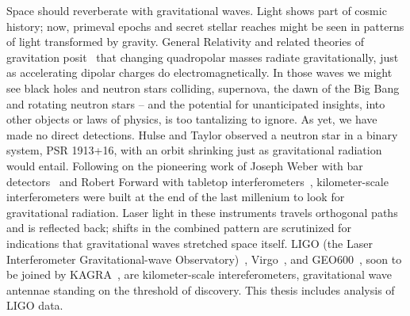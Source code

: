 



        Space should reverberate with gravitational waves. 
Light shows part of cosmic history; now, primeval epochs and secret stellar reaches might be seen in patterns of light transformed by gravity. 
General Relativity and related theories of gravitation posit~\cite{EinsteinRosen1937} that changing quadropolar masses radiate gravitationally, just as accelerating dipolar charges do electromagnetically. 
In those waves we might see black holes and neutron stars colliding, supernova, the dawn of the Big Bang and rotating neutron stars -- and the potential for unanticipated insights, into other objects or laws of physics, is too tantalizing to ignore. 
As yet, we have made no direct detections. 
Hulse and Taylor \cite{HulseTaylor1975} observed a neutron star in a binary system, PSR 1913+16, with an orbit shrinking just as gravitational radiation would entail. 
Following on the pioneering work of Joseph Weber with bar detectors~\cite{Weber1960} and Robert Forward with tabletop interferometers~\cite{Forward1978}, kilometer-scale interferometers were built at the end of the last millenium to look for gravitational radiation. 
Laser light in these instruments travels orthogonal paths and is reflected back; shifts in the combined pattern are scrutinized for indications that gravitational waves stretched space itself. 
LIGO (the Laser Interferometer Gravitational-wave Observatory)~\cite{LIGOFirst2004,Fricke2009}, Virgo~\cite{Acernese2005}, and GEO600~\cite{Willke2002,Hild2009}, soon to be joined by KAGRA~\cite{Kuroda2010}, are kilometer-scale intereferometers, gravitational wave antennae standing on the threshold of discovery.
This thesis includes analysis of LIGO data.

